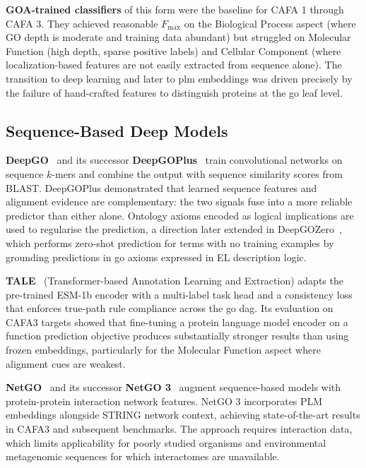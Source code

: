 \textbf{GOA-trained classifiers} of this form were the baseline for CAFA 1
through CAFA 3. They achieved reasonable $F_{\max}$ on the Biological Process
aspect (where GO depth is moderate and training data abundant) but struggled on
Molecular Function (high depth, sparse positive labels) and Cellular Component
(where localization-based features are not easily extracted from sequence alone).
The transition to deep learning and later to \gls{plm} embeddings was driven
precisely by the failure of hand-crafted features to distinguish proteins at the
\gls{go} leaf level.

\subsection{Sequence-Based Deep Models}
\label{subsec:related-seq-deep}

\textbf{DeepGO}~\cite{kulmanov2018deepgo} and its successor
\textbf{DeepGOPlus}~\cite{kulmanov2020deepgoplus} train convolutional networks on
sequence $k$-mers and combine the output with sequence similarity scores from
BLAST. DeepGOPlus demonstrated that learned sequence features and alignment
evidence are complementary: the two signals fuse into a more reliable predictor
than either alone. Ontology axioms encoded as logical implications are used to
regularise the prediction, a direction later extended in
DeepGOZero~\cite{kulmanov2022deepgozero}, which performs zero-shot prediction for
terms with no training examples by grounding predictions in \gls{go} axioms
expressed in EL description logic.

\textbf{TALE}~\cite{tale2023} (Transformer-based Annotation Learning and
Extraction) adapts the pre-trained ESM-1b encoder with a multi-label task head
and a consistency loss that enforces true-path rule compliance across the \gls{go}
\gls{dag}. Its evaluation on CAFA3 targets showed that fine-tuning a protein
language model encoder on a function prediction objective produces substantially
stronger results than using frozen embeddings, particularly for the Molecular
Function aspect where alignment cues are weakest.

\textbf{NetGO}~\cite{you2019netgo} and its successor \textbf{NetGO 3}~\cite{you2023netgo3}
augment sequence-based models with protein-protein interaction network features.
NetGO 3 incorporates PLM embeddings alongside STRING network context, achieving
state-of-the-art results in CAFA3 and subsequent benchmarks. The approach
requires interaction data, which limits applicability for poorly studied
organisms and environmental metagenomic sequences for which interactomes are
unavailable.

